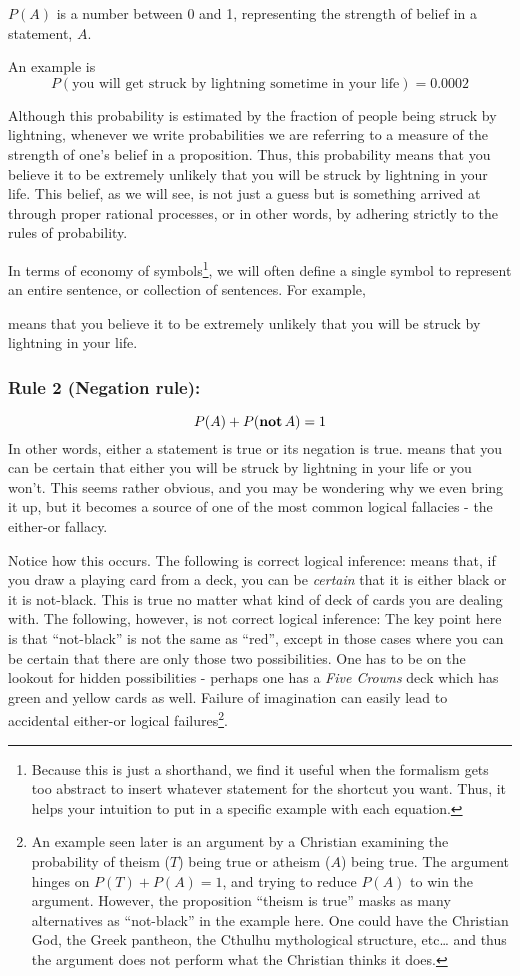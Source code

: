 \documentclass{tufte-book}
\begin{document}
\(P(A)\) is a number between 0 and 1, representing the strength of
belief in a statement, \(A\).

An example is
\[P(\mbox{you will get struck by lightning sometime in your life}) = 0.0002\]

Although this probability is estimated by the fraction of people being
struck by lightning, whenever we write probabilities we are referring to
a measure of the strength of one's belief in a proposition. Thus, this
probability means that you believe it to be extremely unlikely that you
will be struck by lightning in your life. This belief, as we will see,
is not just a guess but is something arrived at through proper rational
processes, or in other words, by adhering strictly to the rules of
probability.

In terms of economy of symbols\footnote{Because this is just a
  shorthand, we find it useful when the formalism gets too abstract to
  insert whatever statement for the shortcut you want. Thus, it helps
  your intuition to put in a specific example with each equation.}, we
will often define a single symbol to represent an entire sentence, or
collection of sentences. For example,

means that you believe it to be extremely unlikely that you will be
struck by lightning in your life.

\subsubsection{Rule 2 (Negation rule):}\label{rule-2-negation-rule}

\[P(A) + P({\rm\bf not}\, A) = 1\] In other words, either a statement is
true or its negation is true. means that you can be certain that either
you will be struck by lightning in your life or you won't. This seems
rather obvious, and you may be wondering why we even bring it up, but it
becomes a source of one of the most common logical fallacies - the
either-or fallacy.

Notice how this occurs. The following is correct logical inference:
means that, if you draw a playing card from a deck, you can be
\emph{certain} that it is either black or it is not-black. This is true
no matter what kind of deck of cards you are dealing with. The
following, however, is not correct logical inference: The key point here
is that ``not-black'' is not the same as ``red'', except in those cases
where you can be certain that there are only those two possibilities.
One has to be on the lookout for hidden possibilities - perhaps one has
a \emph{Five Crowns} deck which has green and yellow cards as well.
Failure of imagination can easily lead to accidental either-or logical
failures\footnote{An example seen later is an argument by a Christian
  examining the probability of theism (\(T\)) being true or atheism
  (\(A\)) being true. The argument hinges on \(P(T)+P(A)=1\), and trying
  to reduce \(P(A)\) to win the argument. However, the proposition
  ``theism is true'' masks as many alternatives as ``not-black'' in the
  example here. One could have the Christian God, the Greek pantheon,
  the Cthulhu mythological structure, etc\ldots{} and thus the argument
  does not perform what the Christian thinks it does.}.
\end{document}
